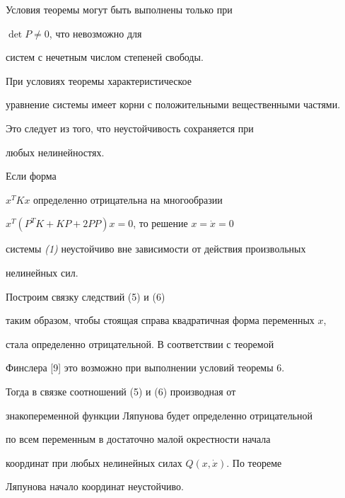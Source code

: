 \begin{note} Условия теоремы могут быть выполнены только при


$\det P \ne {0}$, что невозможно для


систем с нечетным числом степеней свободы.


\end{note}





\begin{note} При условиях теоремы характеристическое


уравнение системы имеет корни с положительными вещественными частями.


Это следует из того, что неустойчивость сохраняется при


любых нелинейностях.


\end{note}





\begin{thm} Если форма


$x^{T}Kx $ определенно отрицательна на многообразии


$x^{T}(P^{T}K+KP+2PP)x=0$, то решение $x= \Dot{x}=0$


системы {\em (1)} неустойчиво вне зависимости от действия произвольных


нелинейных сил.


\end{thm}





\begin{pf} Построим связку следствий (5) и (6)


таким образом, чтобы стоящая справа квадратичная форма переменных $x$,


стала определенно отрицательной. В соответствии с теоремой


Финслера [9] это возможно при выполнении условий теоремы 6.


Тогда в связке соотношений (5) и (6) производная от


знакопеременной функции Ляпунова будет определенно отрицательной


по всем переменным в достаточно малой окрестности начала


координат при любых нелинейных силах $Q(x,\Dot x )$. По теореме


Ляпунова начало координат неустойчиво.


\end{pf}





